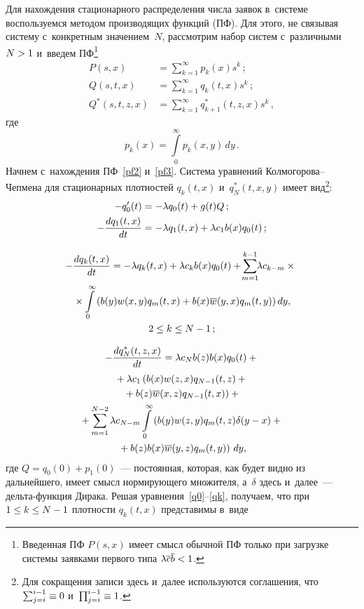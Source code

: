 \begin{multicols}{2}
Для нахождения стационарного распределения числа заявок в~системе 
воспользуемся методом производящих функций (ПФ).
Для этого, не связывая систему с~конкретным значением~$N$, 
рассмотрим набор систем с~различными $N\hm>1$ и~введем %
ПФ\footnote{Введенная ПФ $P(s,x)$ имеет смысл обычной %
ПФ только при загрузке системы заявками первого типа
$\lambda \overline{c} \overline{b} \hm<1$.}
\begin{align}
\label{pf1}
P(s,x)&=\sum\limits_{k=1}^\infty p_k(x)s^k\,;
\\
\label{pf2}
Q(s,t,x)&=\sum\limits_{k=1}^\infty q_k(t,x)s^k\,;
\\
\label{pf3}
Q^*(s,t,z,x)&=\sum\limits_{k=1}^\infty q^*_{k+1}(t,z,x)s^k\,,
\end{align}
где 
$$p_k(x) = \int\limits_0^\infty p_k(x,y)\,dy\,.
$$
Начнем с~нахождения ПФ~\eqref{pf2} и~\eqref{pf3}. 
Система уравнений Кол\-мо\-го\-ро\-ва--Чеп\-ме\-на 
для стационарных плотностей $q_k(t,x)$ и~$q^*_N(t,x,y)$ 
имеет вид\footnote{Для сокращения
записи здесь и~далее используются соглашения, что $\sum\nolimits_{j=i}^{i-1} 
\hm\equiv 0$ и~$\prod\nolimits_{j=i}^{i-1} \hm\equiv 1$.}:
\begin{align}
\label{q0}
-q'_0(t)&=-\lambda q_0(t) +  g(t) Q\,;
\\
\label{q1}
-\displaystyle\frac{\displaystyle dq_1(t,x)\mathstrut}{\displaystyle dt\mathstrut}
&= -\lambda q_1(t,x) + \lambda c_1 b(x) q_0(t)\,;
\end{align}

\noindent
\begin{multline}
\label{qk} 
\hspace*{-0.202pt}\!-\displaystyle\frac{\displaystyle dq_k(t,x)\mathstrut}{\displaystyle dt\mathstrut} = -\lambda q_k(t,x) + \lambda c_k  b(x) q_0(t)
+ \!\sum\limits_{m=1}^{k-1} \!\!\lambda c_{k-m}\times{}\\
{}\times \int\limits_0^\infty \left (
b(y) w(x,y) q_m(t,x) + b(x) \overline{w}(y,x) q_m(t,y) \right )
dy, \\ 2 \le k \le N-1\,;
\end{multline}

\vspace*{-12pt}

\noindent
\begin{multline}
\label{q*n}
-\displaystyle\frac{\displaystyle dq^*_N(t,z,x)\mathstrut}{\displaystyle dt\mathstrut} = \lambda c_N  b(z) b(x) q_0(t) +{}\\
{}+ \lambda c_{1} \left (
b(x) w(z,x) q_{N-1}(t,z) + {}\right.\\
\left.{}+b(z) \overline{w}(x,z) q_{N-1}(t,x)
\right )
+{}
\\
{}+ \sum\limits_{m=1}^{N-2}
\lambda c_{N-m} \int\limits_0^\infty \left (
b(y) w(z,y) q_m(t,z) \delta(y-x) +{}\right.\\
\left.{}+
b(z) b(x) \overline{w}(y,z) q_m(t,y)
\right )\,dy,
\end{multline}
где $Q=q_0(0)+p_1(0)$~--- постоянная, которая, как будет 
видно из дальнейшего, имеет смысл нормирующего множителя, а~$\delta$ 
здесь и~далее~--- дель\-та-функ\-ция Дирака.
Решая уравнения~\eqref{q0}--\eqref{qk}, получаем, что при $1 \hm\le k \hm\le 
N\hm-1$ плотности $q_k(t,x)$ представимы в~виде 


\end{multicols}
